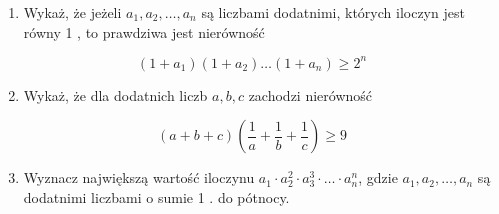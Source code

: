 \documentclass[10pt]{article}
\begin{document}
\begin{enumerate}
  \item Wykaż, że jeżeli \(a_{1}, a_{2}, \ldots, a_{n}\) są liczbami dodatnimi, których iloczyn jest równy 1 , to prawdziwa jest nierówność
\end{enumerate}

\[
\left(1+a_{1}\right)\left(1+a_{2}\right) \ldots\left(1+a_{n}\right) \geq 2^{n}
\]

\begin{enumerate}
  \setcounter{enumi}{1}
  \item Wykaż, że dla dodatnich liczb \(a, b, c\) zachodzi nierówność
\end{enumerate}

\[
(a+b+c)\left(\frac{1}{a}+\frac{1}{b}+\frac{1}{c}\right) \geq 9
\]

\begin{enumerate}
  \setcounter{enumi}{2}
  \item Wyznacz największą wartość iloczynu \(a_{1} \cdot a_{2}^{2} \cdot a_{3}^{3} \cdot \ldots \cdot a_{n}^{n}\), gdzie \(a_{1}, a_{2}, \ldots, a_{n}\) są dodatnimi liczbami o sumie 1 . do pótnocy.
\end{enumerate}
\end{document}
